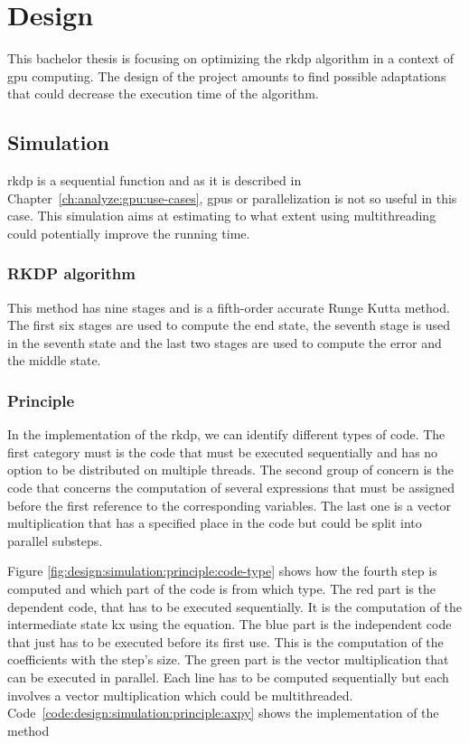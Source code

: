 \chapter{Design}
\label{ch:design}

This bachelor thesis is focusing on optimizing the \acrlong{rkdp} algorithm
in a context of \acrshort{gpu} computing.
The design of the project amounts to find possible adaptations that could
decrease the execution time of the algorithm.

\section{Simulation}
\label{ch:design:simulation}

\acrshort{rkdp} is a sequential function and as it is described in Chapter~\ref{ch:analyze:gpu:use-cases},
\acrshort{gpu}s or parallelization is not so useful in this case.
This simulation aims at estimating to what extent using multithreading could
potentially improve the running time.

\subsection{RKDP algorithm}
\label{ch:design:simulation:rkdp}

This method has nine stages and is a fifth-order accurate Runge Kutta method.
The first six stages are used to compute the end state, the seventh stage is used
in the seventh state and the last two stages are used to compute the error and the
middle state.

\subsection{Principle}
\label{ch:design:simulation:principle}

In the implementation of the \acrshort{rkdp}, we can identify different types of
code.
The first category must is the code that must be executed sequentially and has no option
to be distributed on multiple threads.
The second group of concern is the code that concerns the computation of several
expressions that must be assigned before the first reference to the
corresponding variables.
The last one is a vector multiplication that has a specified place in the code
but could be split into parallel substeps.

Figure \ref{fig:design:simulation:principle:code-type} shows how the
fourth step is computed and which part of the code is from which type.
The red part is the dependent code, that has to be executed sequentially.
It is the computation of the intermediate state kx using the equation.
The blue part is the independent code that just has to be executed before its
first use. This is the computation of the coefficients with the step's size.
The green part is the vector multiplication that can be executed in parallel.
Each line has to be computed sequentially but each involves a vector
multiplication which could be multithreaded.
Code~\ref{code:design:simulation:principle:axpy} shows the implementation of the
method

